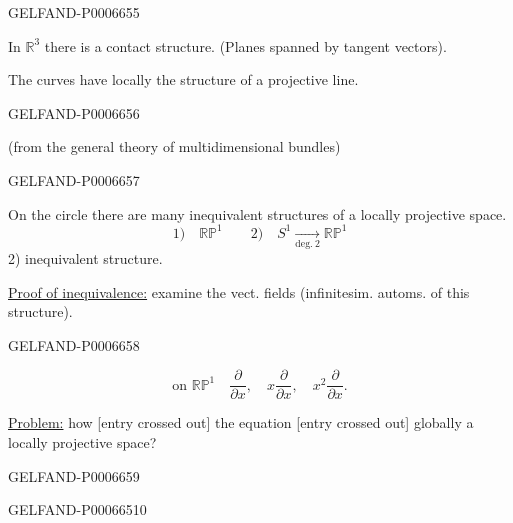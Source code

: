 \begin{GelfandAdjacentEvidence}{GELFAND-P000665}{5}


In \(\mathbb R^3\) there is a contact structure. (Planes spanned by tangent vectors).

The curves have locally the structure of a projective line.
\end{GelfandAdjacentEvidence}
\begin{GelfandAdjacentEvidence}{GELFAND-P000665}{6}


(from the general theory of multidimensional bundles)
\end{GelfandAdjacentEvidence}
\begin{GelfandAdjacentEvidence}{GELFAND-P000665}{7}


On the circle there are many inequivalent structures of a locally projective space.
\[
1)\quad\mathbb{RP}^1\qquad
2)\quad S^1\xrightarrow[\text{deg.}~2]{}\mathbb{RP}^1
\]
2) inequivalent structure.

\underline{Proof of inequivalence:} examine the vect. fields (infinitesim. automs. of this structure).
\end{GelfandAdjacentEvidence}
\begin{GelfandAdjacentEvidence}{GELFAND-P000665}{8}

\[
\text{on }\mathbb{RP}^1\quad
\frac{\partial}{\partial x},\quad
x\frac{\partial}{\partial x},\quad x^2\frac{\partial}{\partial x}.
\]

\underline{Problem:} how [entry crossed out] the equation [entry crossed out] globally a locally projective space?
\end{GelfandAdjacentEvidence}
\begin{GelfandAdjacentEvidence}{GELFAND-P000665}{9}

\end{GelfandAdjacentEvidence}
\begin{GelfandAdjacentEvidence}{GELFAND-P000665}{10}

\end{GelfandAdjacentEvidence}
